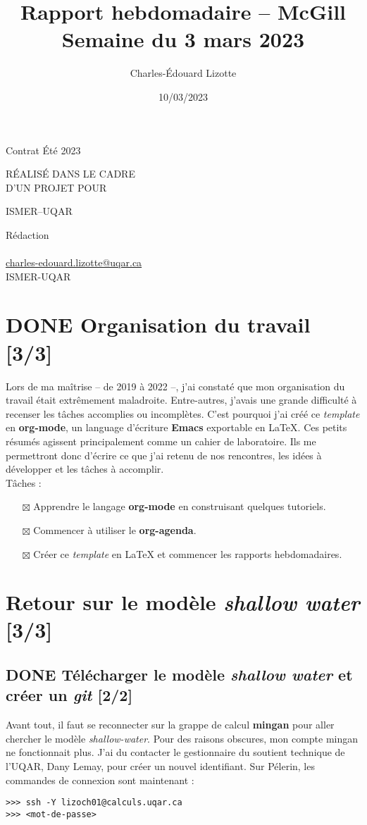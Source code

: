 \documentclass[10pt]{article}
\author{Charles-Édouard Lizotte}
\date{10/03/2023}
\title{Rapport hebdomadaire -- McGill\\\medskip
\large Semaine du 3 mars 2023}
\makeatletter
\numberwithin{equation}{section}
\newcommand{\mytitlepage}{
\begin{titlepage}
\begin{center}
{\Large Contrat Été 2023 \par}
\vspace{2cm}
{\Large \MakeUppercase{\thetitle} \par}
\vspace{2cm}
RÉALISÉ DANS LE CADRE\\ D'UN PROJET POUR \par
\vspace{2cm}
{\Large ISMER--UQAR \par}
\vspace{2cm}
{\thedate}
\end{center}
\vfill
Rédaction \\
{\theauthor}\\
\url{charles-edouard.lizotte@uqar.ca}\\
ISMER-UQAR
\end{titlepage}
}
\makeatother
\begin{document}
\mytitlepage
\tableofcontents\newpage


\section{{\bfseries\sffamily DONE} Organisation du travail [3/3]}
\label{sec:org5f71863}
Lors de ma maîtrise -- de 2019 à 2022 --, j'ai constaté que mon organisation du travail était extrêmement maladroite.
Entre-autres, j'avais une grande difficulté à recenser les tâches accomplies ou incomplètes. 
C'est pourquoi j'ai créé ce \emph{template} en \textbf{org-mode}, un language d'écriture \textbf{Emacs} exportable en \LaTeX{}.
Ces petits résumés agissent principalement comme un cahier de laboratoire. 
Ils me permettront donc d'écrire ce que j'ai retenu de nos rencontres, les idées à développer et les tâches à accomplir.\\[0pt]

Tâches : 
\begin{itemize}
\item[{$\boxtimes$}] Apprendre le langage \textbf{org-mode} en construisant quelques tutoriels.
\item[{$\boxtimes$}] Commencer à utiliser le \textbf{org-agenda}.
\item[{$\boxtimes$}] Créer ce \emph{template} en \LaTeX{} et commencer les rapports hebdomadaires.
\end{itemize}

\section{Retour sur le modèle \emph{shallow water} [3/3]}
\label{sec:orgc9899bc}
\subsection{{\bfseries\sffamily DONE} Télécharger le modèle \emph{shallow water} et créer un \emph{git} [2/2]}
\label{sec:orga730bde}
Avant tout, il faut se reconnecter sur la grappe de calcul \textbf{mingan} pour aller chercher le modèle \emph{shallow-water}. 
Pour des raisons obscures, mon compte mingan ne fonctionnait plus.
J'ai du contacter le gestionnaire du soutient technique de l'UQAR, Dany Lemay, pour créer un nouvel identifiant. 
Sur Pélerin, les commandes de connexion sont maintenant : 
\begin{verbatim}
>>> ssh -Y lizoch01@calculs.uqar.ca
>>> <mot-de-passe>
\end{verbatim}
\end{document}

